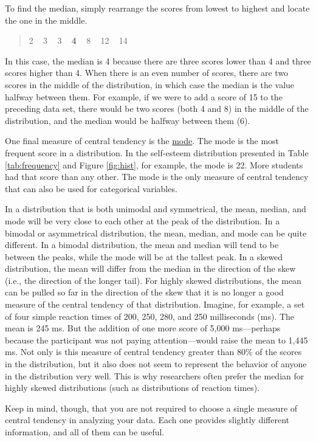 \documentclass[
]{krantz}
\begin{document}
To find the median, simply rearrange the scores from lowest to highest and locate the one in the middle.

\begin{quote}
2 ~ 3 ~ 3 ~ \textbf{4} ~ 8 ~ 12 ~ 14
\end{quote}

In this case, the median is 4 because there are three scores lower than 4 and three scores higher than 4. When there is an even number of scores, there are two scores in the middle of the distribution, in which case the median is the value halfway between them. For example, if we were to add a score of 15 to the preceding data set, there would be two scores (both 4 and 8) in the middle of the distribution, and the median would be halfway between them (6).

One final measure of central tendency is the \hyperref[mode]{mode}. The mode is the most frequent score in a distribution. In the self-esteem distribution presented in Table \ref{tab:frequency} and Figure \ref{fig:hist}, for example, the mode is 22. More students had that score than any other. The mode is the only measure of central tendency that can also be used for categorical variables.

In a distribution that is both unimodal and symmetrical, the mean, median, and mode will be very close to each other at the peak of the distribution. In a bimodal or asymmetrical distribution, the mean, median, and mode can be quite different. In a bimodal distribution, the mean and median will tend to be between the peaks, while the mode will be at the tallest peak. In a skewed distribution, the mean will differ from the median in the direction of the skew (i.e., the direction of the longer tail). For highly skewed distributions, the mean can be pulled so far in the direction of the skew that it is no longer a good measure of the central tendency of that distribution. Imagine, for example, a set of four simple reaction times of 200, 250, 280, and 250 milliseconds (ms). The mean is 245 ms. But the addition of one more score of 5,000 ms---perhaps because the participant was not paying attention---would raise the mean to 1,445 ms. Not only is this measure of central tendency greater than 80\% of the scores in the distribution, but it also does not seem to represent the behavior of anyone in the distribution very well. This is why researchers often prefer the median for highly skewed distributions (such as distributions of reaction times).

Keep in mind, though, that you are not required to choose a single measure of central tendency in analyzing your data. Each one provides slightly different information, and all of them can be useful.
\end{document}
